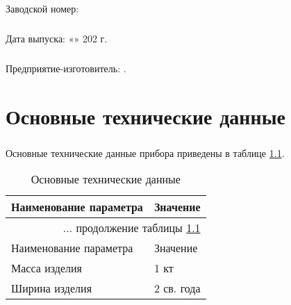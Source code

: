 \paragraph{} Заводской номер: \underline{\hspace{5cm}}
\vspace{5mm}

\paragraph{} Дата выпуска:  «\underline{\hspace{1cm}}» \underline{\hspace{2cm}} 202\underline{\hspace{0.7cm}} г.
\vspace{5mm}

\paragraph{} Предприятие-изготовитель: \orgName.


\chapter{Основные технические данные}

\paragraph{} Основные технические данные прибора приведены в таблице \ref{tab:tech_data}.


\begin{longtable}{|p{8cm}|p{8cm}|}
	\caption{\label{tab:tech_data} Основные технические данные} \\
			
			\hline
	 		Наименование параметра & Значение  \\ 
	 		\hline
	 		\endfirsthead
	 		
	 		\multicolumn{2}{r}{... продолжение таблицы \ref{tab:tech_data}}\\ %
	 		\hline
	 		Наименование параметра & Значение  \\ 
	 		\hline
	 		\endhead
	 		
	 		Масса изделия & 1 кт  \\ \hline
	 		
			Ширина изделия & 2 св. года \\ \hline
			
\end{longtable}


